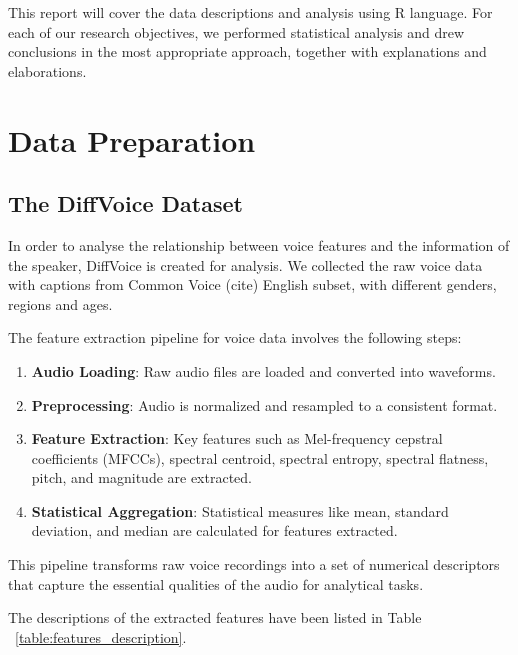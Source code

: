 \documentclass{article}
\begin{document}
	This report will cover the data descriptions and analysis using R language. For each of our research objectives, we performed statistical analysis and drew conclusions in the most appropriate approach, together with explanations and elaborations.
	
	
	\section{Data Preparation}
	
	\subsection{The DiffVoice Dataset}
	
	In order to analyse the relationship between voice features and the information of the speaker, DiffVoice is created for analysis. We collected the raw voice data with captions from Common Voice (cite) English subset, with different genders, regions and ages.
	
	The feature extraction pipeline for voice data involves the following steps:
	\begin{enumerate}
		\item \textbf{Audio Loading}: Raw audio files are loaded and converted into waveforms.
		\item \textbf{Preprocessing}: Audio is normalized and resampled to a consistent format.
		\item \textbf{Feature Extraction}: Key features such as Mel-frequency cepstral coefficients (MFCCs), spectral centroid, spectral entropy, spectral flatness, pitch, and magnitude are extracted.
		\item \textbf{Statistical Aggregation}: Statistical measures like mean, standard deviation, and median are calculated for features extracted.
	\end{enumerate}
	
	This pipeline transforms raw voice recordings into a set of numerical descriptors that capture the essential qualities of the audio for analytical tasks.
	
	The descriptions of the extracted features have been listed in Table ~\ref{table:features_description}.
	
\end{document}
